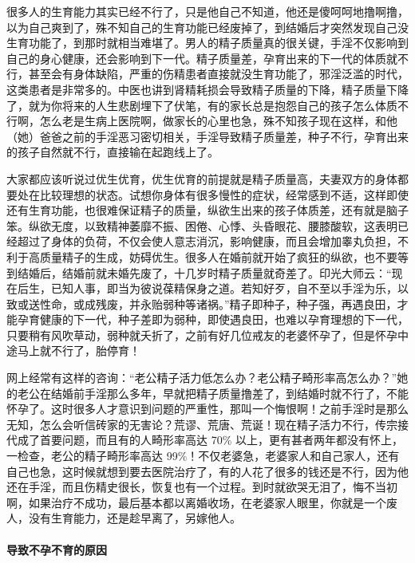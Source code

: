 很多人的生育能力其实已经不行了，只是他自己不知道，他还是傻呵呵地撸啊撸，以为自己爽到了，殊不知自己的生育功能已经废掉了，到结婚后才突然发现自己没生育功能了，到那时就相当难堪了。男人的精子质量真的很关键，手淫不仅影响到自己的身心健康，还会影响到下一代。精子质量差，孕育出来的下一代的体质就不行，甚至会有身体缺陷，严重的伤精患者直接就没生育功能了，邪淫泛滥的时代，这类患者是非常多的。中医也讲到肾精耗损会导致精子质量的下降，精子质量下降了，就为你将来的人生悲剧埋下了伏笔，有的家长总是抱怨自己的孩子怎么体质不行啊，怎么老是生病上医院啊，做家长的心里也急，殊不知孩子现在这样，和他（她）爸爸之前的手淫恶习密切相关，手淫导致精子质量差，种子不行，孕育出来的孩子自然就不行，直接输在起跑线上了。

大家都应该听说过优生优育，优生优育的前提就是精子质量高，夫妻双方的身体都要处在比较理想的状态。试想你身体有很多慢性的症状，经常感到不适，这样即使还有生育功能，也很难保证精子的质量，纵欲生出来的孩子体质差，还有就是脑子笨。纵欲无度，以致精神萎靡不振、困倦、心悸、头昏眼花、腰膝酸软，这表明已经超过了身体的负荷，不仅会使人意志消沉，影响健康，而且会增加睾丸负担，不利于高质量精子的生成，妨碍优生。很多人在婚前就开始了疯狂的纵欲，也不要等到结婚后，结婚前就未婚先废了，十几岁时精子质量就奇差了。印光大师云：“现在后生，已知人事，即当为彼说葆精保身之道。若知好歹，自不至以手淫为乐，以致或送性命，或成残废，并永贻弱种等诸祸。”精子即种子，种子强，再遇良田，才能孕育健康的下一代，种子差即为弱种，即使遇良田，也难以孕育理想的下一代，只要稍有风吹草动，弱种就夭折了，之前有好几位戒友的老婆怀孕了，但是怀孕中途马上就不行了，胎停育！

网上经常有这样的咨询：“老公精子活力低怎么办？老公精子畸形率高怎么办？”她的老公在结婚前手淫那么多年，早就把精子质量撸差了，到结婚时就不行了，不能怀孕了。这时很多人才意识到问题的严重性，那叫一个悔恨啊！之前手淫时是那么无知，怎么会听信砖家的无害论？荒谬、荒唐、荒诞！现在精子活力不行，传宗接代成了首要问题，而且有的人畸形率高达 70\% 以上，更有甚者两年都没有怀上，一检查，老公的精子畸形率高达 99\%！不仅老婆急，老婆家人和自己家人，还有自己也急，这时候就想到要去医院治疗了，有的人花了很多的钱还是不行，因为他还在手淫，而且伤精史很长，恢复也有一个过程。到时就欲哭无泪了，悔不当初啊，如果治疗不成功，最后基本都以离婚收场，在老婆家人眼里，你就是一个废人，没有生育能力，还是趁早离了，另嫁他人。

\paragraph{导致不孕不育的原因}

